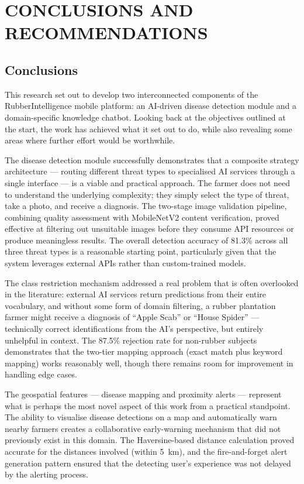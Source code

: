 \chapter{CONCLUSIONS AND RECOMMENDATIONS}

\section{Conclusions}

This research set out to develop two interconnected components of the RubberIntelligence mobile platform: an AI-driven disease detection module and a domain-specific knowledge chatbot. Looking back at the objectives outlined at the start, the work has achieved what it set out to do, while also revealing some areas where further effort would be worthwhile.

The disease detection module successfully demonstrates that a composite strategy architecture --- routing different threat types to specialised AI services through a single interface --- is a viable and practical approach. The farmer does not need to understand the underlying complexity; they simply select the type of threat, take a photo, and receive a diagnosis. The two-stage image validation pipeline, combining quality assessment with MobileNetV2 content verification, proved effective at filtering out unsuitable images before they consume API resources or produce meaningless results. The overall detection accuracy of 81.3\% across all three threat types is a reasonable starting point, particularly given that the system leverages external APIs rather than custom-trained models.

The class restriction mechanism addressed a real problem that is often overlooked in the literature: external AI services return predictions from their entire vocabulary, and without some form of domain filtering, a rubber plantation farmer might receive a diagnosis of ``Apple Scab'' or ``House Spider'' --- technically correct identifications from the AI's perspective, but entirely unhelpful in context. The 87.5\% rejection rate for non-rubber subjects demonstrates that the two-tier mapping approach (exact match plus keyword mapping) works reasonably well, though there remains room for improvement in handling edge cases.

The geospatial features --- disease mapping and proximity alerts --- represent what is perhaps the most novel aspect of this work from a practical standpoint. The ability to visualise disease detections on a map and automatically warn nearby farmers creates a collaborative early-warning mechanism that did not previously exist in this domain. The Haversine-based distance calculation proved accurate for the distances involved (within 5~km), and the fire-and-forget alert generation pattern ensured that the detecting user's experience was not delayed by the alerting process.

